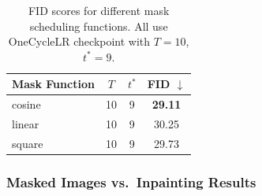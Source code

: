 \documentclass[10pt,twocolumn,letterpaper]{article}
\begin{document}
\begin{table}[h]
	\centering
	\small
	\begin{tabular}{lccc}
		\toprule
		\textbf{Mask Function} & \textbf{$T$} & \textbf{$t^*$} & \textbf{FID $\downarrow$} \\ \midrule
		cosine                 & 10           & 9              & \textbf{29.11}            \\
		linear                 & 10           & 9              & 30.25                     \\
		square                 & 10           & 9              & 29.73                     \\
		\bottomrule
	\end{tabular}
	\caption{FID scores for different mask scheduling functions. All use OneCycleLR checkpoint with $T=10$, $t^*=9$.}
	\label{tab:fid_comparison}
\end{table}

\subsubsection{Masked Images vs.\ Inpainting Results}
\end{document}
